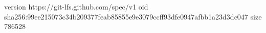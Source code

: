 version https://git-lfs.github.com/spec/v1
oid sha256:99ee215073c34b209377feab85855e9e3079ccff93dfe0947afbb1a23d3dc047
size 786528
